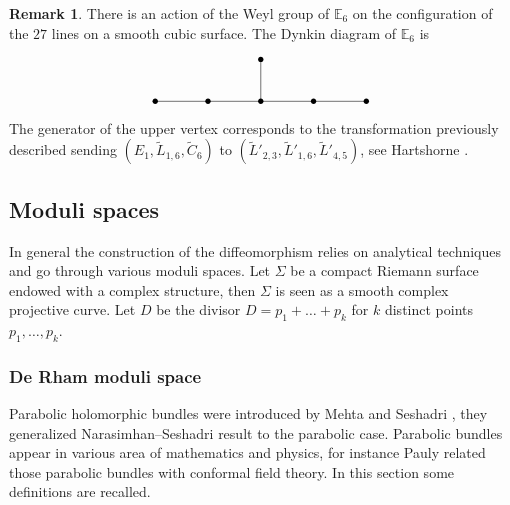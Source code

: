 \documentclass[11pt]{article}
\theoremstyle{definition}
\newtheorem{remark}[definition]{Remark}
\theoremstyle{plain}
\begin{document}
\begin{remark}
There is an action of the Weyl group of $\mathbb{E}_6$ on the configuration of the $27$ lines on a smooth cubic surface. The Dynkin diagram of $\mathbb{E}_6$ is
\[\begin{tikzcd}[scale=.8]
	&& \bullet \\
	\bullet & \bullet & \bullet & \bullet & \bullet
	\arrow[no head, from=2-1, to=2-2, start anchor=center, end anchor = center ]
	\arrow[no head, from=2-3, to=2-4,start anchor=center, end anchor = center ]
	\arrow[no head, from=2-4, to=2-5,start anchor=center, end anchor = center ]
	\arrow[no head, from=1-3, to=2-3,start anchor=center, end anchor = center ]
	\arrow[no head, from=2-2, to=2-3,start anchor=center, end anchor = center ]
\end{tikzcd}
\]
The generator of the upper vertex corresponds to the transformation previously described sending $(E_1, \widetilde{L}_{1,6},\widetilde{C}_6) $ to $(\widetilde{L}'_{2,3},\widetilde{L}'_{1,6},\widetilde{L}'_{4,5})$, see Hartshorne \cite[V, Exer.\,4.11]{Hartshorne}.
\end{remark}

\subsection{Moduli spaces}\label{sect_moduli_spaces}

In general the construction of the diffeomorphism relies on analytical techniques and go through various moduli spaces. Let $\Sigma$ be a compact Riemann surface endowed with a complex structure, then $\Sigma$ is seen as a smooth complex projective curve. Let $D$ be the divisor $D=p_1+\dots +p_k$ for $k$ distinct points $p_1,\dots,p_k$.

\subsubsection{De Rham moduli space}\label{subsect_dR_alg}
Parabolic holomorphic bundles were introduced by Mehta and Seshadri \cite{Mehta_Seshadri}, they generalized Narasimhan--Seshadri \cite{Narasimhan_Seshadri} result to the parabolic case. Parabolic bundles appear in various area of mathematics and physics, for instance Pauly \cite{Pauly} related those parabolic bundles with conformal field theory. In this section some definitions are recalled.
\end{document}
